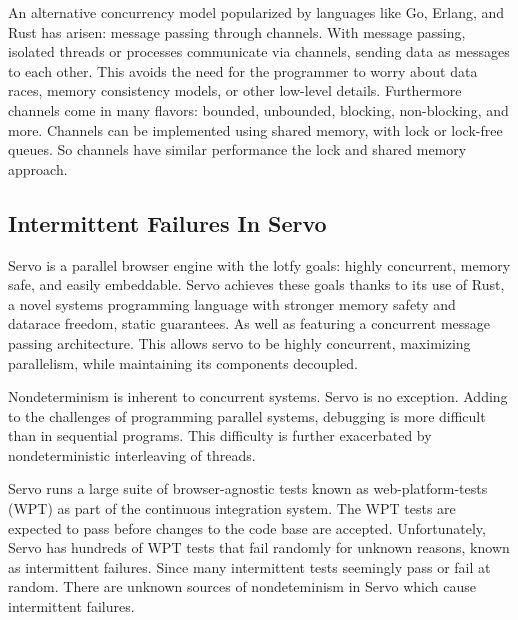 \documentclass{article}
\begin{document}
An alternative concurrency model popularized by languages like Go, Erlang, and Rust has
arisen: message passing through channels. With message passing, isolated
threads or processes communicate via channels, sending data as messages to each other.
This avoids the need for the programmer to worry about data races, memory consistency
models, or other low-level details. Furthermore channels come in many flavors:
bounded, unbounded, blocking, non-blocking, and more. Channels can be implemented using
shared memory, with lock or lock-free queues. So channels have similar performance the
lock and shared memory approach.

\subsection{Intermittent Failures In Servo}
Servo is a parallel browser engine with the lotfy goals: highly concurrent,
memory safe, and easily embeddable. Servo achieves these goals thanks to
its use of Rust, a novel systems programming language with stronger memory safety and
datarace freedom, static guarantees. As well as featuring a concurrent message passing
architecture. This allows servo to be highly concurrent, maximizing parallelism,
while maintaining its components decoupled.

Nondeterminism is inherent to concurrent systems. Servo is no exception. Adding to
the challenges of programming parallel systems, debugging is more difficult than in
sequential programs. This difficulty is further exacerbated by nondeterministic
interleaving of threads.

Servo runs a large suite of browser-agnostic tests known as web-platform-tests (WPT)
as part of the continuous integration system. The WPT tests are expected to pass before
changes to the code base are accepted. Unfortunately, Servo has hundreds of WPT tests that
fail randomly for unknown reasons, known as intermittent failures. Since many intermittent
tests seemingly pass or fail at random. There are unknown sources of nondeteminism in
Servo which cause intermittent failures.
\end{document}
